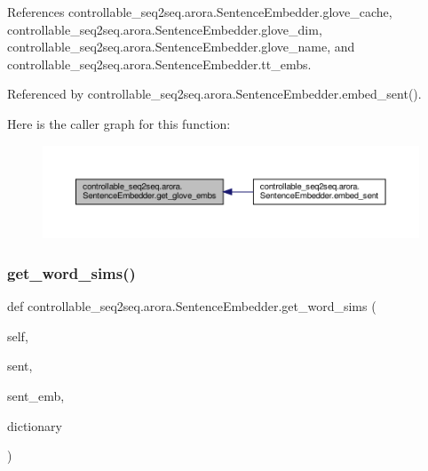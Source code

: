 References controllable\+\_\+seq2seq.\+arora.\+Sentence\+Embedder.\+glove\+\_\+cache, controllable\+\_\+seq2seq.\+arora.\+Sentence\+Embedder.\+glove\+\_\+dim, controllable\+\_\+seq2seq.\+arora.\+Sentence\+Embedder.\+glove\+\_\+name, and controllable\+\_\+seq2seq.\+arora.\+Sentence\+Embedder.\+tt\+\_\+embs.



Referenced by controllable\+\_\+seq2seq.\+arora.\+Sentence\+Embedder.\+embed\+\_\+sent().

Here is the caller graph for this function\+:
\nopagebreak
\begin{figure}[H]
\begin{center}
\leavevmode
\includegraphics[width=350pt]{classcontrollable__seq2seq_1_1arora_1_1SentenceEmbedder_aa53ecb589f5fe43fe92d326511491e98_icgraph}
\end{center}
\end{figure}
\mbox{\label{classcontrollable__seq2seq_1_1arora_1_1SentenceEmbedder_ab01f3112c0765e2c7f9da902386ac865}} 
\subsubsection{\texorpdfstring{get\+\_\+word\+\_\+sims()}{get\_word\_sims()}}
{\footnotesize\ttfamily def controllable\+\_\+seq2seq.\+arora.\+Sentence\+Embedder.\+get\+\_\+word\+\_\+sims (\begin{DoxyParamCaption}\item[{}]{self,  }\item[{}]{sent,  }\item[{}]{sent\+\_\+emb,  }\item[{}]{dictionary }\end{DoxyParamCaption})}

